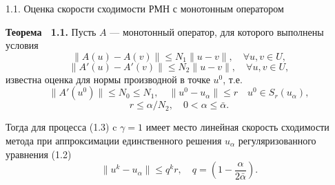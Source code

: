 \documentclass[10pt,pdf, mathserif, hyperref={unicode}]{beamer}
\begin{document}
%	
%		
\begin{frame}{\small 1.1. Оценка скорости сходимости РМН с монотонным оператором}
	\begin{block}{\bf Теорема ~1.1.} 
		Пусть $A$ --- монотонный оператор, для которого выполнены условия 
		$$\|A(u)-A(v)\|\leqslant N_1\|u-v\|, \quad \forall u, v \in U,$$ 
		$$\|A'(u)-A'(v)\|\leqslant N_2\|u-v\|, \quad \forall u, v \in U,$$
		известна оценка для нормы производной в точке $u^0$, т.е.
		$$	\|A'(u^0)\| \leqslant N_0\leqslant N_1, \quad \|u^0-u_\alpha\| \leqslant r \quad
		u^0 \in S_r(u_\alpha),$$ $$r\leqslant \alpha/N_2, \quad 0<\alpha \leqslant \bar\alpha.$$ 
		
		\smallskip
		Тогда для процесса (1.3) c $\gamma=1$ имеет место линейная скорость сходимости метода при аппроксимации единственного решения $u_\alpha$ регуляризованного уравнения (1.2)
		$$\| u^{k}-u_\alpha \| \leqslant q^kr, \quad q=(1-\frac{\alpha}{2\bar\alpha}).$$
	\end{block}
	\let\thefootnote\relax\let\thefootnote\relax{}
\end{frame}
\end{document}
